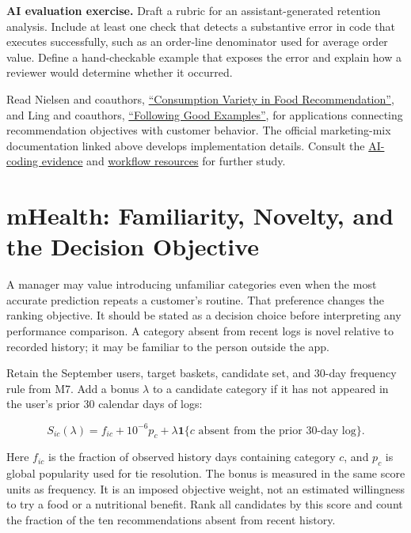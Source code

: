 \textbf{AI evaluation exercise.} Draft a rubric for an
assistant-generated retention analysis. Include at least one check that
detects a substantive error in code that executes successfully, such as
an order-line denominator used for average order value. Define a
hand-checkable example that exposes the error and explain how a reviewer
would determine whether it occurred.

Read Nielsen and coauthors,
\href{https://doi.org/10.1086/720453}{``Consumption Variety in Food
Recommendation''}, and Ling and coauthors,
\href{https://doi.org/10.1145/3485447.3514193}{``Following Good
Examples''}, for applications connecting recommendation objectives with
customer behavior. The official marketing-mix documentation linked above
develops implementation details. Consult the
\href{../01_Resources/10_AI_Coding_Concepts_and_Evidence/README.md}{AI-coding
evidence} and
\href{../01_Resources/11_AI_Coding_Tools_and_Workflows/README.md}{workflow
resources} for further study.

\hypertarget{M08-mhealth-familiarity-novelty-and-the-decision-objective}{%
\section{mHealth: Familiarity, Novelty, and the Decision
Objective}\label{M08-mhealth-familiarity-novelty-and-the-decision-objective}}

\noindent A manager may value introducing unfamiliar categories even when the most
accurate prediction repeats a customer's routine. That preference
changes the ranking objective. It should be stated as a decision choice
before interpreting any performance comparison. A category absent from
recent logs is novel relative to recorded history; it may be familiar to
the person outside the app.

Retain the September users, target baskets, candidate set, and 30-day
frequency rule from M7. Add a bonus \(\lambda\) to a candidate category
if it has not appeared in the user's prior 30 calendar days of logs:

\[
S_{ic}(\lambda)=f_{ic}+10^{-6}p_c+
\lambda\mathbf{1}\{c\text{ absent from the prior 30-day log}\}.
\]

Here \(f_{ic}\) is the fraction of observed history days containing
category \(c\), and \(p_c\) is global popularity used for tie
resolution. The bonus is measured in the same score units as frequency.
It is an imposed objective weight, not an estimated willingness to try a
food or a nutritional benefit. Rank all candidates by this score and
count the fraction of the ten recommendations absent from recent
history.


